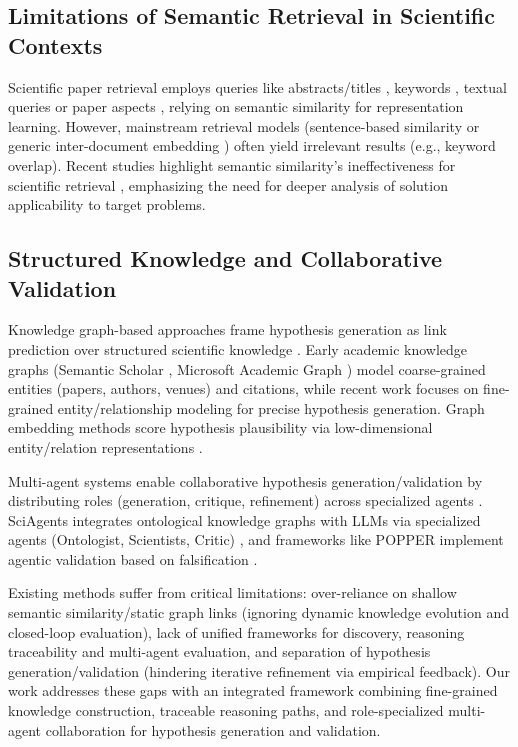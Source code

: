 \documentclass[runningheads]{llncs}
\begin{document}
\subsection{Limitations of Semantic Retrieval in Scientific Contexts}
Scientific paper retrieval employs queries like abstracts/titles \cite{singh2023scincl,ostendorff2022neighborhood,cohan2020specter}, keywords \cite{sesagiri2017full}, textual queries \cite{anand2017proposed,parisot2022scientific,medic2023similarity} or paper aspects \cite{singh2024scispace,singh2023scincl,mysore2022multi,ostendorff2022s2orc}, relying on semantic similarity for representation learning. However, mainstream retrieval models (sentence-based similarity \cite{reimers2019sentence,beltagy2019scibert} or generic inter-document embedding \cite{cohan2020specter,singh2022specter2}) often yield irrelevant results (e.g., keyword overlap). Recent studies highlight semantic similarity's ineffectiveness for scientific retrieval \cite{yang2024c}, emphasizing the need for deeper analysis of solution applicability to target problems.


\subsection{Structured Knowledge and Collaborative Validation}
Knowledge graph-based approaches frame hypothesis generation as link prediction over structured scientific knowledge \cite{borrego2025research,de2021discovering}. Early academic knowledge graphs (Semantic Scholar \cite{ammar2018construction}, Microsoft Academic Graph \cite{wang2020microsoft}) model coarse-grained entities (papers, authors, venues) and citations, while recent work focuses on fine-grained entity/relationship modeling \cite{luan2018multi} for precise hypothesis generation. Graph embedding methods score hypothesis plausibility via low-dimensional entity/relation representations \cite{rossi2021knowledge,wang2021survey}.

Multi-agent systems enable collaborative hypothesis generation/validation by distributing roles (generation, critique, refinement) across specialized agents \cite{ghafarollahi2025sciagents,ke2025biodisco}. SciAgents integrates ontological knowledge graphs with LLMs via specialized agents (Ontologist, Scientists, Critic) \cite{ghafarollahi2025sciagents}, and frameworks like POPPER implement agentic validation based on falsification \cite{huang2025automated}.

Existing methods suffer from critical limitations: over-reliance on shallow semantic similarity/static graph links (ignoring dynamic knowledge evolution and closed-loop evaluation), lack of unified frameworks for discovery, reasoning traceability and multi-agent evaluation, and separation of hypothesis generation/validation (hindering iterative refinement via empirical feedback). Our work addresses these gaps with an integrated framework combining fine-grained knowledge construction, traceable reasoning paths, and role-specialized multi-agent collaboration for hypothesis generation and validation.
\end{document}
